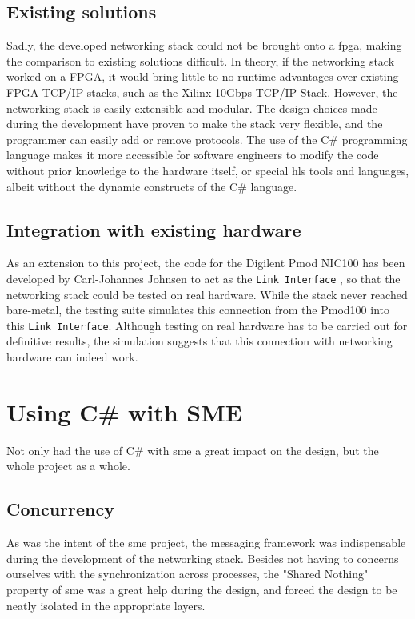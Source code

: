 \subsection{Existing solutions}
Sadly, the developed networking stack could not be brought onto a \gls{fpga},
making the comparison to existing solutions difficult.
In theory, if the networking stack worked on a FPGA, it would bring little to
no runtime advantages over existing FPGA TCP/IP stacks, such as the
Xilinx 10Gbps TCP/IP Stack\cite{sidler2016lowlatencytcp}.
However, the networking stack is easily extensible and modular. The design
choices made during the development have proven to make the stack very flexible,
and the programmer can easily add or remove protocols. The use of the C\#
programming language makes it more accessible for software engineers to modify
the code without prior knowledge to the hardware itself, or special \gls{hls}
tools and languages, albeit without the dynamic constructs of the C\# language.


\subsection{Integration with existing hardware} \label{subsec:hardware_integration}
As an extension to this project, the code for the Digilent Pmod NIC100\cite{pmod_nic100}
has been developed by Carl-Johannes Johnsen to act as the \texttt{Link Interface}
\cite{carl_pmod_nic100}, so that the networking stack could be tested on real
hardware.
While the stack never reached bare-metal, the testing suite simulates this
connection from the Pmod100 into this \texttt{Link Interface}. Although testing
on real hardware has to be carried out for definitive results, the simulation
suggests that this connection with networking hardware can indeed work.


\section{Using C\# with SME}
Not only had the use of C\# with \gls{sme} a great impact on the design, but the
whole project as a whole.

\subsection{Concurrency}
As was the intent of the \gls{sme} project, the messaging framework was
indispensable during the development of the networking stack. Besides not
having to concerns ourselves with the synchronization across processes, the
"Shared Nothing" property of \gls{sme} was a great help during the design, and
forced the design to be neatly isolated in the appropriate layers.

